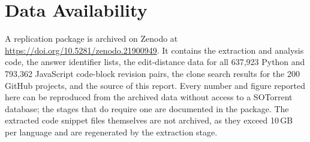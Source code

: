 \documentclass[onecolumn,11pt]{IEEEtran}
\begin{document}
\section*{Data Availability}

A replication package is archived on Zenodo at \url{https://doi.org/10.5281/zenodo.21900949}.
It contains the extraction and analysis code, the answer identifier lists, the edit-distance data for all 637{,}923 Python and 793{,}362 JavaScript code-block revision pairs, the clone search results for the 200 GitHub projects, and the source of this report.
Every number and figure reported here can be reproduced from the archived data without access to a SOTorrent database; the stages that do require one are documented in the package.
The extracted code snippet files themselves are not archived, as they exceed 10\,GB per language and are regenerated by the extraction stage.



\end{document}
